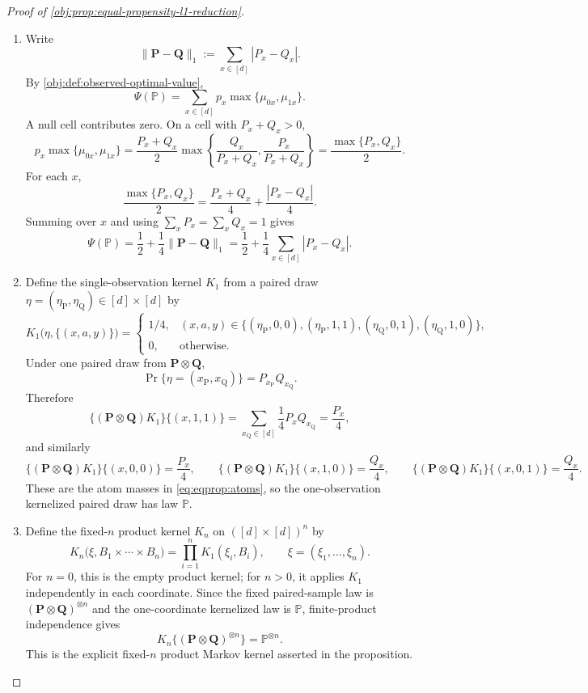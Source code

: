 \documentclass[11pt]{article}
\begin{document}
\begin{proof}[Proof of \cref{obj:prop:equal-propensity-l1-reduction}]
\begin{enumerate}
\item Write
\[
\|\mathbf P-\mathbf Q\|_1:=\sum_{x\in[d]}|P_x-Q_x|.
\]
By \cref{obj:def:observed-optimal-value},
\[
\Psi(\mathbb P)
=
\sum_{x\in[d]}p_x\max\{\mu_{0x},\mu_{1x}\}.
\]
A null cell contributes zero. On a cell with \(P_x+Q_x>0\),
\[
p_x\max\{\mu_{0x},\mu_{1x}\}
=
\frac{P_x+Q_x}{2}
\max\left\{\frac{Q_x}{P_x+Q_x},\frac{P_x}{P_x+Q_x}\right\}
=
\frac{\max\{P_x,Q_x\}}2.
\]
For each \(x\),
\[
\frac{\max\{P_x,Q_x\}}2
=
\frac{P_x+Q_x}{4}+\frac{|P_x-Q_x|}{4}.
\]
Summing over \(x\) and using \(\sum_xP_x=\sum_xQ_x=1\) gives
\begin{equation}
\label{eq:eqprop:value}
\Psi(\mathbb P)
=
\frac12+\frac14\|\mathbf P-\mathbf Q\|_1
=
\frac12+\frac14\sum_{x\in[d]}|P_x-Q_x|.
\end{equation} %

\item Define the single-observation kernel \(K_1\) from a paired draw
\(\eta=(\eta_{\mathrm P},\eta_{\mathrm Q})\in[d]\times[d]\) by
\[
K_1\bigl(\eta,\{(x,a,y)\}\bigr)
=
\begin{cases}
1/4,& (x,a,y)\in
\{(\eta_{\mathrm P},0,0),(\eta_{\mathrm P},1,1),
  (\eta_{\mathrm Q},0,1),(\eta_{\mathrm Q},1,0)\},\\
0,& \text{otherwise}.
\end{cases}
\]
Under one paired draw from \(\mathbf P\otimes\mathbf Q\),
\[
\Pr\{\eta=(x_{\mathrm P},x_{\mathrm Q})\}=P_{x_{\mathrm P}}Q_{x_{\mathrm Q}}.
\]
Therefore
\[
\{(\mathbf P\otimes\mathbf Q)K_1\}\{(x,1,1)\}
=
\sum_{x_{\mathrm Q}\in[d]}\frac14P_xQ_{x_{\mathrm Q}}
=
\frac{P_x}{4},
\]
and similarly
\[
\{(\mathbf P\otimes\mathbf Q)K_1\}\{(x,0,0)\}=\frac{P_x}{4},
\qquad
\{(\mathbf P\otimes\mathbf Q)K_1\}\{(x,1,0)\}=\frac{Q_x}{4},
\qquad
\{(\mathbf P\otimes\mathbf Q)K_1\}\{(x,0,1)\}=\frac{Q_x}{4}.
\]
These are the atom masses in \cref{eq:eqprop:atoms}, so the one-observation kernelized paired
draw has law \(\mathbb P\). %

\item Define the fixed-\(n\) product kernel \(K_n\) on \(([d]\times[d])^n\) by
\[
K_n\bigl(\xi,B_1\times\cdots\times B_n\bigr)
=
\prod_{i=1}^n K_1(\xi_i,B_i),
\qquad
\xi=(\xi_1,\ldots,\xi_n).
\]
For \(n=0\), this is the empty product kernel; for \(n>0\), it applies \(K_1\) independently in
each coordinate. Since the fixed paired-sample law is \((\mathbf P\otimes\mathbf Q)^{\otimes n}\)
and the one-coordinate kernelized law is \(\mathbb P\), finite-product independence gives
\begin{equation}
\label{eq:eqprop:product-kernel}
K_n\{(\mathbf P\otimes\mathbf Q)^{\otimes n}\}
=
\mathbb P^{\otimes n}.
\end{equation}
This is the explicit fixed-\(n\) product Markov kernel asserted in the proposition. %


\end{enumerate}
\end{proof}
\end{document}
